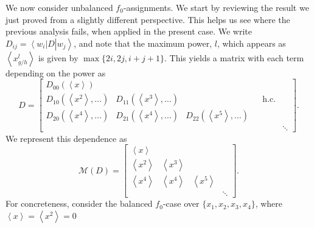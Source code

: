 \documentclass{article}
\begin{document}
We now consider unbalanced $f_{0}$-assignments. We start by reviewing the result we just proved from a slightly different perspective. This helps us see where the previous analysis fails, when applied in the present case.  We write $D_{ij}=\left\langle w_{i}\right|D\left|w_{j}\right\rangle $,
and note that the maximum power, $l$, which appears as $\left\langle x_{g/h}^{l}\right\rangle $
is given by $\max\{2i,2j,i+j+1\}$. This yields a matrix with each
term depending on the power as
\begin{displaymath}
  D=\left[\begin{array}{cccccc}
      D_{00}(\left\langle x\right\rangle )                                                                                                                                       \\
      D_{10}(\left\langle x^{2}\right\rangle ,\dots) & D_{11}(\left\langle x^{3}\right\rangle ,\dots) &                                                &  & \text{h.c.}          \\
      D_{20}(\left\langle x^{4}\right\rangle ,\dots) & D_{21}(\left\langle x^{4}\right\rangle ,\dots) & D_{22}(\left\langle x^{5}\right\rangle ,\dots)                           \\
                                                     &                                                &                                                &  &             & \ddots
    \end{array}\right].
\end{displaymath}
We represent this dependence as
\begin{displaymath}
  \mathcal{M}(D)=\left[\begin{array}{cccc}
      \left\langle x\right\rangle                                                                                  \\
      \left\langle x^{2}\right\rangle & \left\langle x^{3}\right\rangle                                            \\
      \left\langle x^{4}\right\rangle & \left\langle x^{4}\right\rangle & \left\langle x^{5}\right\rangle          \\
                                      &                                 &                                 & \ddots
    \end{array}\right].
\end{displaymath}
For concreteness, consider the balanced $f_{0}$-case over $\{x_{1},x_{2},x_{3},x_{4}\}$,
where $\left\langle x\right\rangle =\left\langle x^{2}\right\rangle =0$
\end{document}
